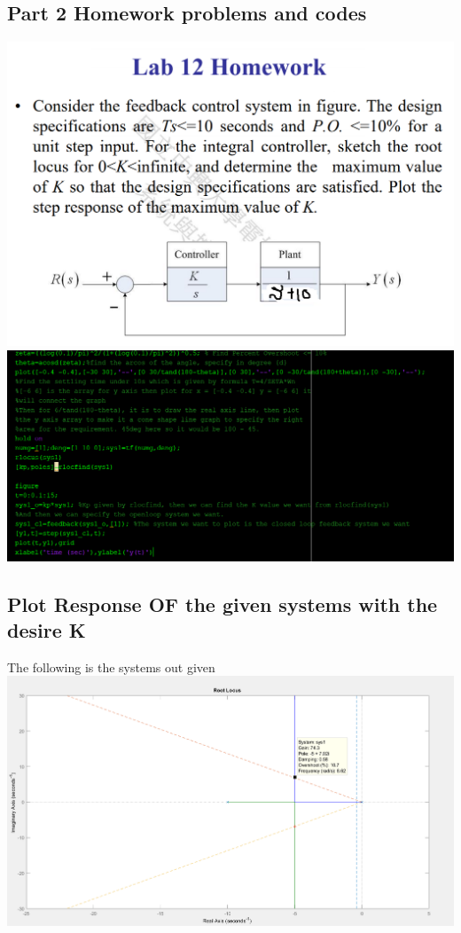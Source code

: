 \documentclass[12pt]{article}
\begin{document}
\cleardoublepage

 
\subsection{Part 2 Homework problems and codes}

\includegraphics[scale=0.5]{../Lab12/Problem2.png}\\
\includegraphics[scale=0.7]{../Lab12/Code2.png}\\ 

\cleardoublepage


\subsection{Plot Response OF the given systems with the desire K} 
The following is the systems out given\\

\includegraphics[scale=0.4]{../Lab12/Result2.png}\\
\end{document}
